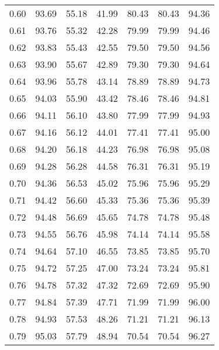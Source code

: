 \begin{tabular}{|c|c|c|c|c|c|c|}
      0.60 &     93.69 &     55.18 &      41.99 &   80.43 &      80.43 &         94.36 \\
      0.61 &     93.76 &     55.32 &      42.28 &   79.99 &      79.99 &         94.46 \\
      0.62 &     93.83 &     55.43 &      42.55 &   79.50 &      79.50 &         94.56 \\
      0.63 &     93.90 &     55.67 &      42.89 &   79.30 &      79.30 &         94.64 \\
      0.64 &     93.96 &     55.78 &      43.14 &   78.89 &      78.89 &         94.73 \\
      0.65 &     94.03 &     55.90 &      43.42 &   78.46 &      78.46 &         94.81 \\
      0.66 &     94.11 &     56.10 &      43.80 &   77.99 &      77.99 &         94.93 \\
      0.67 &     94.16 &     56.12 &      44.01 &   77.41 &      77.41 &         95.00 \\
      0.68 &     94.20 &     56.18 &      44.23 &   76.98 &      76.98 &         95.08 \\
      0.69 &     94.28 &     56.28 &      44.58 &   76.31 &      76.31 &         95.19 \\
      0.70 &     94.36 &     56.53 &      45.02 &   75.96 &      75.96 &         95.29 \\
      0.71 &     94.42 &     56.60 &      45.33 &   75.36 &      75.36 &         95.39 \\
      0.72 &     94.48 &     56.69 &      45.65 &   74.78 &      74.78 &         95.48 \\
      0.73 &     94.55 &     56.76 &      45.98 &   74.14 &      74.14 &         95.58 \\
      0.74 &     94.64 &     57.10 &      46.55 &   73.85 &      73.85 &         95.70 \\
      0.75 &     94.72 &     57.25 &      47.00 &   73.24 &      73.24 &         95.81 \\
      0.76 &     94.78 &     57.32 &      47.32 &   72.69 &      72.69 &         95.90 \\
      0.77 &     94.84 &     57.39 &      47.71 &   71.99 &      71.99 &         96.00 \\
      0.78 &     94.93 &     57.53 &      48.26 &   71.21 &      71.21 &         96.13 \\
      0.79 &     95.03 &     57.79 &      48.94 &   70.54 &      70.54 &         96.27 \\

\end{tabular}
